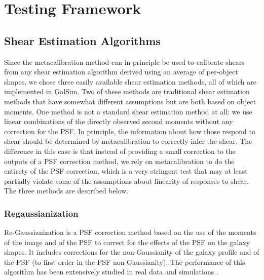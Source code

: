 \documentclass[iop]{emulateapj}
\begin{document}
\section{Testing Framework}
\label{sec:testing}

\subsection{Shear Estimation Algorithms}

Since the metacalibration method can in principle be used to calibrate
shears from any shear estimation algorithm derived using an average of per-object shapes, we chose three easily
available shear estimation methods, all of which are implemented in
GalSim.  Two of these methods are traditional shear estimation
methods that have somewhat different assumptions but are both based on
object moments.  One method is not a standard shear estimation method
at all: we use linear combinations of the directly observed second
moments without any correction for the PSF.  In principle, the
information about how those respond to shear should be determined by
metacalibration to correctly infer the shear.  The difference in this
case is that instead of providing a small correction to the outputs of
a PSF correction method, we rely on metacalibration to do the entirety
of the PSF correction, which is a very stringent test that may at least 
partially violate some of the assumptions about
linearity of responses to shear.  The three methods are described below.

\subsubsection{Regaussianization}

Re-Gaussianization \citep{2003MNRAS.343..459H} is a PSF correction
method based on the use of the moments of the image and of the PSF to
correct for the effects of the PSF on the galaxy shapes. It includes
corrections for the non-Gaussianity of the galaxy profile
\citep{2002AJ....123..583B,2003MNRAS.343..459H} and of the PSF (to
first order in the PSF non-Gaussianity). The performance of this
algorithm has been extensively studied in real data and simulations
\citep[e.g.,][]{2005MNRAS.361.1287M,2012MNRAS.420.1518M,2013MNRAS.432.1544M,2015MNRAS.450.2963M}.
\end{document}
